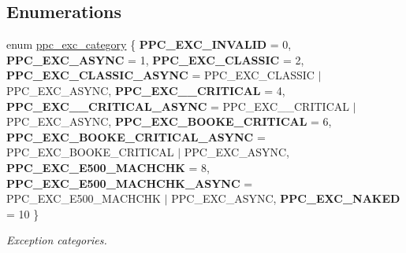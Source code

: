 \subsection*{Enumerations}
\begin{DoxyCompactItemize}
\item 
enum \mbox{\hyperlink{group__ppc__exc_gab5c9ba70d9560d278d06983d7ea3babe}{ppc\+\_\+exc\+\_\+category}} \{ \newline
{\bfseries P\+P\+C\+\_\+\+E\+X\+C\+\_\+\+I\+N\+V\+A\+L\+ID} = 0, 
{\bfseries P\+P\+C\+\_\+\+E\+X\+C\+\_\+\+A\+S\+Y\+NC} = 1, 
{\bfseries P\+P\+C\+\_\+\+E\+X\+C\+\_\+\+C\+L\+A\+S\+S\+IC} = 2, 
{\bfseries P\+P\+C\+\_\+\+E\+X\+C\+\_\+\+C\+L\+A\+S\+S\+I\+C\+\_\+\+A\+S\+Y\+NC} = P\+P\+C\+\_\+\+E\+X\+C\+\_\+\+C\+L\+A\+S\+S\+IC $\vert$ P\+P\+C\+\_\+\+E\+X\+C\+\_\+\+A\+S\+Y\+NC, 
\newline
{\bfseries P\+P\+C\+\_\+\+E\+X\+C\+\_\+\_\+\+C\+R\+I\+T\+I\+C\+AL} = 4, 
{\bfseries P\+P\+C\+\_\+\+E\+X\+C\+\_\+\_\+\+C\+R\+I\+T\+I\+C\+A\+L\+\_\+\+A\+S\+Y\+NC} = P\+P\+C\+\_\+\+E\+X\+C\+\_\+\_\+\+C\+R\+I\+T\+I\+C\+AL $\vert$ P\+P\+C\+\_\+\+E\+X\+C\+\_\+\+A\+S\+Y\+NC, 
{\bfseries P\+P\+C\+\_\+\+E\+X\+C\+\_\+\+B\+O\+O\+K\+E\+\_\+\+C\+R\+I\+T\+I\+C\+AL} = 6, 
{\bfseries P\+P\+C\+\_\+\+E\+X\+C\+\_\+\+B\+O\+O\+K\+E\+\_\+\+C\+R\+I\+T\+I\+C\+A\+L\+\_\+\+A\+S\+Y\+NC} = P\+P\+C\+\_\+\+E\+X\+C\+\_\+\+B\+O\+O\+K\+E\+\_\+\+C\+R\+I\+T\+I\+C\+AL $\vert$ P\+P\+C\+\_\+\+E\+X\+C\+\_\+\+A\+S\+Y\+NC, 
\newline
{\bfseries P\+P\+C\+\_\+\+E\+X\+C\+\_\+\+E500\+\_\+\+M\+A\+C\+H\+C\+HK} = 8, 
{\bfseries P\+P\+C\+\_\+\+E\+X\+C\+\_\+\+E500\+\_\+\+M\+A\+C\+H\+C\+H\+K\+\_\+\+A\+S\+Y\+NC} = P\+P\+C\+\_\+\+E\+X\+C\+\_\+\+E500\+\_\+\+M\+A\+C\+H\+C\+HK $\vert$ P\+P\+C\+\_\+\+E\+X\+C\+\_\+\+A\+S\+Y\+NC, 
{\bfseries P\+P\+C\+\_\+\+E\+X\+C\+\_\+\+N\+A\+K\+ED} = 10
 \}
\begin{DoxyCompactList}\small\item\em Exception categories. \end{DoxyCompactList}\end{DoxyCompactItemize}
